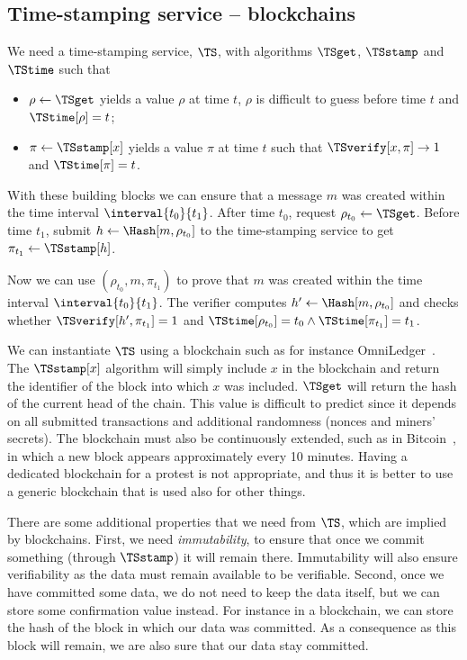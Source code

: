 \subsection{Time-stamping service -- blockchains}%
\label{StorageProperties}


We need a time-stamping service, \(\TS\), with algorithms \(\TSget\), \(\TSstamp\) and \(\TStime\) such that
\begin{itemize}
  \item \(\rho \gets \TSget\) yields a value \(\rho\) at time \(t\), \(\rho\) is difficult to guess before time \(t\) and \(\TStime[\rho] = t\);
  \item \(\pi\gets \TSstamp[x]\) yields a value \(\pi\) at time \(t\) such that \(\TSverify[x, \pi]\to 1\) and \(\TStime[\pi] = t\).
\end{itemize}

With these building blocks we can ensure that a message \(m\) was created within the time interval \(\interval{t_0}{t_1}\).
After time \(t_0\), request \(\rho_{t_0}\gets \TSget\).
Before time \(t_1\), submit \(h\gets \Hash[m, \rho_{t_0}]\) to the time-stamping service to get \(\pi_{t_1}\gets \TSstamp[h]\).

Now we can use \((\rho_{t_0}, m, \pi_{t_1})\) to prove that \(m\) was created within the time interval \(\interval{t_0}{t_1}\).
The verifier computes \(h'\gets \Hash[m, \rho_{t_0}]\) and checks whether \(\TSverify[h', \pi_{t_1}] = 1\) and \(\TStime[\rho_{t_0}] = t_0\land \TStime[\pi_{t_1}] = t_1\).

We can instantiate \(\TS\) using a blockchain such as for instance OmniLedger~\cite{OmniLedger}.
The \(\TSstamp[x]\) algorithm will simply include \(x\) in the blockchain and return the identifier of the block into which \(x\) was included.
\(\TSget\) will return the hash of the current head of the chain.
This value is difficult to predict since it depends on all submitted transactions and additional randomness (\eg nonces and miners' secrets).
The blockchain must also be continuously extended, such as in Bitcoin~\cite{Bitcoin}, in which a new block appears approximately every 10 minutes.
Having a dedicated blockchain for a protest is not appropriate, and thus it is better to use a generic blockchain that is used also for other things.

There are some additional properties that we need from \(\TS\), which are implied by blockchains.
First, we need \emph{immutability}, to ensure that once we commit something (through \(\TSstamp\)) it will remain there.
Immutability will also ensure verifiability as the data must remain available to be verifiable.
Second, once we have committed some data, we do not need to keep the data itself, but we can store some confirmation value instead.
For instance in a blockchain, we can store the hash of the block in which our data was committed.
As a consequence as this block will remain, we are also sure that our data stay committed.%
